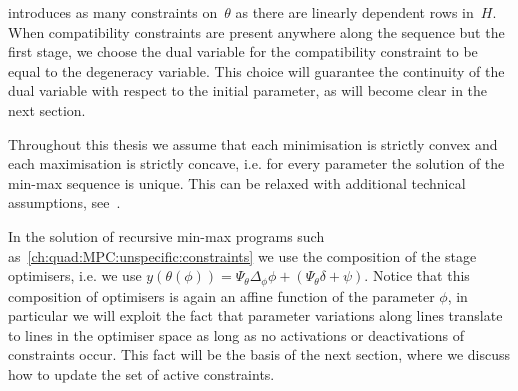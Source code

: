 introduces as many constraints on~$\theta$ as there are linearly dependent rows in~$H$.
%
\\[1em]
%
When compatibility constraints are present anywhere along the sequence but the first stage, we choose the dual variable for the compatibility constraint to be equal to the degeneracy variable.
%
This choice will guarantee the continuity of the dual variable with respect to the initial parameter, as will become clear in the next section.
%
\begin{rem}
Throughout this thesis we assume that each minimisation is strictly convex and each maximisation is strictly concave, i.e. for every parameter the solution of the min-max sequence is unique.
%
This can be relaxed with additional technical assumptions, see~\cite{Buerger:2016}.
\end{rem}
%
\noindent In the solution of recursive min-max programs such as~\eqref{ch:quad:MPC:unspecific:constraints} we use the composition of the stage optimisers, i.e. we use $y(\theta(\phi)) = \Psi_\theta \Delta_\phi \phi + (\Psi_\theta \delta + \psi)$. 
%
Notice that this composition of optimisers is again an affine function of the parameter $\phi$, in particular we will exploit the fact that parameter variations along lines translate to lines in the optimiser space as long as no activations or deactivations of constraints occur. 
%
This fact will be the basis of the next section, where we discuss how to update the set of active constraints.
%
%
%
%

